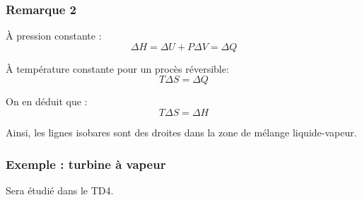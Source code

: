 \documentclass[11pt]{article}
\begin{document}
	\subsubsection*{Remarque 2}
	À pression constante :
	\[
	\Delta H = \Delta U + P \Delta V = \Delta Q
	\]
	
	À température constante pour un procès réversible:
	\[
	T \Delta S = \Delta Q
	\]
	
	On en déduit que :
	\[
	T \Delta S = \Delta H
	\]
	
	Ainsi, les lignes isobares sont des droites dans la zone de mélange liquide-vapeur.
	
	\subsubsection*{Exemple : turbine à vapeur}
	Sera étudié dans le TD4.
	
\end{document}
